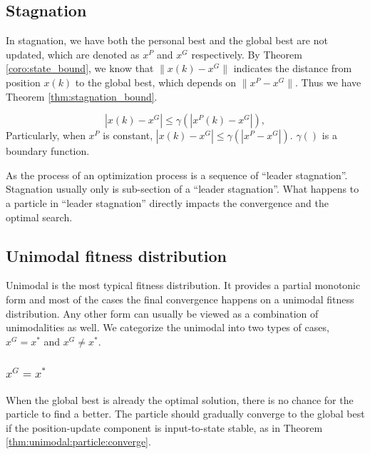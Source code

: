 \subsection{Stagnation}

In stagnation, we have both the personal best and the global best are not updated, which are denoted as $ x^{P} $ and $ x^{G} $ respectively.
By Theorem \ref{coro:state_bound}, we know that $ \lVert x(k) - x^{G} \rVert $ indicates the distance from position $ x(k) $ to the global best, which depends on  $ \lVert x^{P} - x^{G} \rVert $.
Thus we have Theorem \ref{thm:stagnation_bound}.

\begin{mythm}
\label{thm:stagnation_bound}
\begin{equation}
| x(k) - x^{G} | \leq \gamma ( | x^{P}(k) - x^{G} | ), 
\end{equation}
Particularly, when $ x^{P} $ is constant,
$  | x(k) - x^{G} | \leq \gamma ( | x^{P} - x^{G} | ). $
$ \gamma () $ is a boundary function.
\end{mythm}

As the process of an optimization process is a sequence of ``leader stagnation''.
Stagnation usually only is sub-section of a ``leader stagnation''.
What happens to a particle in ``leader stagnation'' directly impacts the convergence and the optimal search.

\subsection{Unimodal fitness distribution}

Unimodal is the most typical fitness distribution.
It provides a partial monotonic form and most of the cases the final convergence happens on a unimodal fitness distribution.
Any other form can usually be viewed as a combination of unimodalities as well.
We categorize the unimodal into two types of cases, $ x^{G} = x^{*} $ and $ x^{G} \not = x^{*} $.

\subsubsection{$ x^{G} = x^{*} $}

When the global best is already the optimal solution, there is no chance for the particle to find a better.
The particle should gradually converge to the global best if the position-update component is input-to-state stable, as in Theorem \ref{thm:unimodal:particle:converge}.

